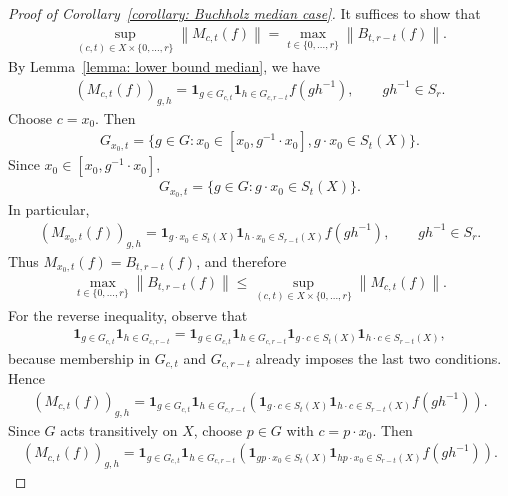 \documentclass[12pt,reqno]{amsart}
\newcommand{\norm}[1]{\left\|#1\right\|}
\numberwithin{equation}{section}
\begin{document}
\begin{proof}[Proof of Corollary~\ref{corollary: Buchholz median case}]
    It suffices to show that
    \begin{align*}
        \sup_{(c,t)\in X\times \{0,\ldots,r\}}\norm{M_{c,t}(f)}=\max_{t\in \{0,\ldots, r\}}\norm{B_{t,r-t}(f)}.
    \end{align*}
    By Lemma~\ref{lemma: lower bound median}, we have
    \begin{align*}
        (M_{c,t}(f))_{g,h}=\mathbf{1}_{g\in G_{c,t}}\mathbf{1}_{h\in G_{c,r-t}}f(gh^{-1}),\qquad gh^{-1}\in S_r.
    \end{align*}
    Choose $c=x_0$. Then
    \begin{align*}
        G_{x_0,t}=\{g\in G: x_0\in [x_0,g^{-1}\cdot x_0], g\cdot x_0\in S_t(X)\}.
    \end{align*}
    Since $x_0\in [x_0,g^{-1}\cdot x_0]$,
    \begin{align*}
        G_{x_0,t}=\{g\in G: g\cdot x_0\in S_t(X)\}.
    \end{align*}
    In particular,
    \begin{align*}
        (M_{x_0,t}(f))_{g,h}=\mathbf{1}_{g\cdot x_0\in S_t(X)}\mathbf{1}_{h\cdot x_0\in S_{r-t}(X)}f(gh^{-1}),\qquad gh^{-1}\in S_r.
    \end{align*}
    Thus $M_{x_0,t}(f)=B_{t,r-t}(f)$, and therefore
    \begin{align*}
        \max_{t\in \{0,\ldots, r\}}\norm{B_{t,r-t}(f)}\le \sup_{(c,t)\in X\times \{0,\ldots, r\}}\norm{M_{c,t}(f)}.
    \end{align*}
    For the reverse inequality, observe that
    \begin{align*}
        \mathbf{1}_{g\in G_{c,t}}\mathbf{1}_{h\in G_{c,r-t}}=\mathbf{1}_{g\in G_{c,t}}\mathbf{1}_{h\in G_{c,r-t}}\mathbf{1}_{g\cdot c\in S_t(X)}\mathbf{1}_{h\cdot c\in S_{r-t}(X)},
    \end{align*}
    because membership in $G_{c,t}$ and $G_{c,r-t}$ already imposes the last two conditions. Hence
    \begin{align*}
         (M_{c,t}(f))_{g,h}=\mathbf{1}_{g\in G_{c,t}}\mathbf{1}_{h\in G_{c,r-t}} \left(\mathbf{1}_{g\cdot c\in S_t(X)}\mathbf{1}_{h\cdot c\in S_{r-t}(X)} f(gh^{-1})\right).
    \end{align*}
    Since $G$ acts transitively on $X$, choose $p\in G$ with $c=p\cdot x_0$. Then
    \begin{align*}
        (M_{c,t}(f))_{g,h}=\mathbf{1}_{g\in G_{c,t}}\mathbf{1}_{h\in G_{c,r-t}} \left(\mathbf{1}_{gp\cdot x_0\in S_t(X)}\mathbf{1}_{hp\cdot x_0\in S_{r-t}(X)} f(gh^{-1})\right).

\end{align*}
\end{proof}
\end{document}
